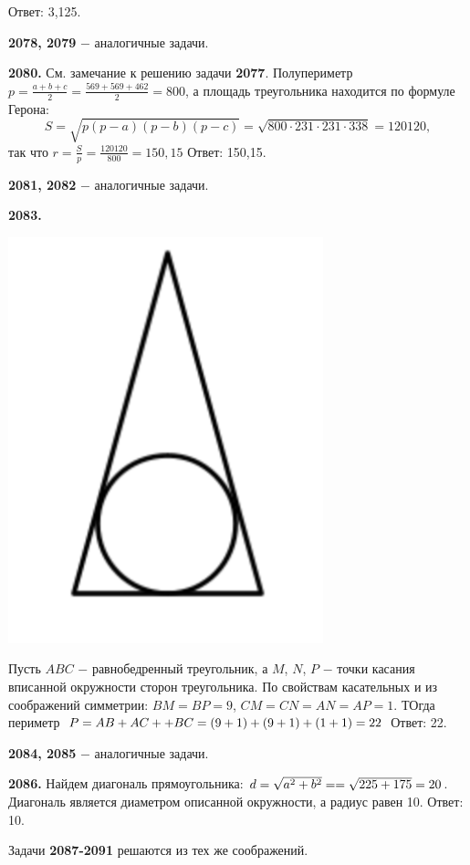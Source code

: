  \null \hspace*{\fill} Ответ: 3,125.

\textbf{2078, 2079} $-$ аналогичные задачи. 

\textbf{2080.} См. замечание к решению задачи \textbf{2077}.   Полупериметр \linebreak$p = \frac{a+b+c}{2} = \frac{569+569+462}{2}=800$, а площадь треугольника находится по формуле Герона:
\[
S = \sqrt{p(p-a)(p-b)(p-c)} = \sqrt{800\cdot231\cdot231\cdot338} = 120120,
\]
так что $r = \frac{S}{p} = \frac{120120}{800} = 150,15$ \newline \null \hspace*{\fill} Ответ: 150,15.

\textbf{2081, 2082} $-$ аналогичные задачи.

\textbf{2083.}

{\centering \includegraphics[width=0.35\linewidth]{Geometry/Content/39.png}
	
}

Пусть $ABC$ $-$ равнобедренный треугольник, а $M$, $N$, $P$ $-$ точки касания вписанной окружности сторон треугольника. По свойствам касательных и из соображений симметрии: $BM = BP = 9$, $CM = CN = AN = AP = 1$. ТОгда периметр $P = AB + AC + \linebreak+BC = (9 + 1) + (9 + 1) + (1 + 1) = 22$ \newline \null \hspace*{\fill} Ответ: 22.

\textbf{2084, 2085} $-$ аналогичные задачи.

\textbf{2086.} Найдем диагональ прямоугольника: $d = \sqrt{a^2+b^2} = \linebreak = \sqrt{225+175} = 20$.  Диагональ является диаметром описанной окружности, а радиус равен 10. \newline \null \hspace*{\fill} Ответ: 10.

Задачи \textbf{2087-2091} решаются из тех же соображений.

